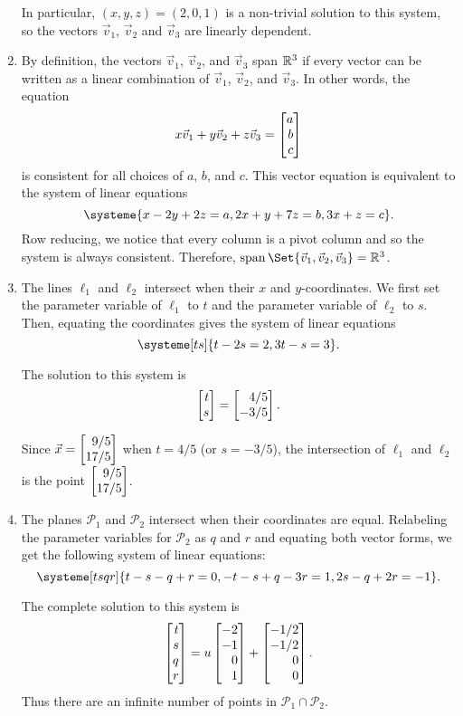 \begin{exercises}
\begin{problist}
\begin{solution}
\begin{enumerate}
				In particular, $(x, y, z)=(2, 0, 1)$ is a non-trivial solution to this
				system, so the vectors $\vec v_{1}$, $\vec v_{2}$ and $\vec v_{3}$
				are linearly dependent.
				
				\item By definition, the vectors $\vec v_{1}$, $\vec v_{2}$, and $\vec v_{3}$
				span $\mathbb{R}^3$ if every vector can be written as a linear combination of $\vec v_1$, $\vec v_2$,
				and $\vec v_3$. In other words, the equation
				\[
					x\vec v_1+y\vec v_2+z\vec v_3=\mat{a\\b\\c}
				\]
				is consistent for all choices of $a$, $b$, and $c$.
				This vector equation is equivalent to the system of linear equations
				\[
					\systeme{x-2y+2z=a,2x+y+7z=b,3x+z=c}.
				\]
				Row reducing, we notice that every column is a pivot column
				and so the system is always consistent. Therefore, $\Span\Set{\vec v_1,\vec v_2,\vec v_3}=\R^3$.
				
				
				\item The lines $\ell_{1}$ and $\ell_{2}$ intersect when their
				$x$ and $y$-coordinates. We first set the parameter variable of $\ell_1$ to $t$ and
				the parameter variable of $\ell_2$ to $s$.
				Then, equating the coordinates
				gives the system of linear equations
				\[
					\systeme[ts]{t-2s=2,3t-s=3}.
				\]
				
				The solution to this system is
				\[
					\mat{t\\s}=\mat{4/5\\-3/5}.
				\]
				
					Since $\vec x=\mat{9/5\\17/5}$ when $t=4/5$ (or $s=-3/5$), the intersection
				of $\ell_{1}$ and $\ell_{2}$ is the point $\mat{9/5\\17/5}$.
				
				\item The planes $\mathcal{P}_{1}$ and $\mathcal{P}_{2}$ intersect
				when their coordinates are equal. Relabeling the parameter variables
				for $\mathcal P_2$ as $q$ and $r$ and equating both vector forms, we get
				the following system of linear equations:
				\[
					\systeme[tsqr]{t-s-q+r=0,-t-s+q-3r=1,2s-q+2r=-1}.
				\]
				
				The complete solution to this system is
				\[
					\mat{t\\s\\q\\r}=u\mat{-2\\-1\\0\\1}+\mat{-1/2\\-1/2\\0\\0}.
				\]
				Thus there are an infinite number of points in $\mathcal P_1\cap \mathcal P_2$.
				

\end{enumerate}
\end{solution}
\end{problist}
\end{exercises}

